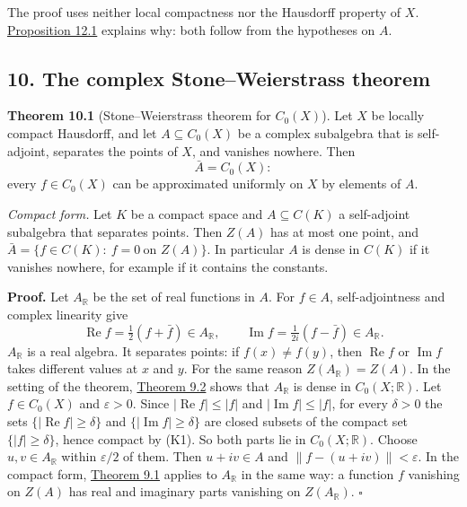 \documentclass[
  english,
  11pt,
  a4paper,
]{article}
\begin{document}
The proof uses neither local compactness nor the Hausdorff property of
\(X\).
\hyperlink{the-stone-weierstrass-theorem-for-functions-vanishing-at-infinity--oa-fnd-sw-10}{Proposition
12.1} explains why: both follow from the hypotheses on \(A\).

\subsection[10. The complex Stone--Weierstrass
theorem]{\texorpdfstring{\protect\hypertarget{the-stone-weierstrass-theorem-for-functions-vanishing-at-infinity--oa-fnd-sw-09}{}{}10.
The complex Stone--Weierstrass
theorem}{10. The complex Stone--Weierstrass theorem}}\label{the-stone-weierstrass-theorem-for-functions-vanishing-at-infinity--OA-FND-SW-09}

\textbf{Theorem 10.1} (Stone--Weierstrass theorem for \(C_0(X)\)). Let
\(X\) be locally compact Hausdorff, and let \(A\subseteq C_0(X)\) be a
complex subalgebra that is self-adjoint, separates the points of \(X\),
and vanishes nowhere. Then \[\bar A=C_0(X):
\tag{10.1}\] every \(f\in C_0(X)\) can be approximated uniformly on
\(X\) by elements of \(A\).

\emph{Compact form.} Let \(K\) be a compact space and
\(A\subseteq C(K)\) a self-adjoint subalgebra that separates points.
Then \(Z(A)\) has at most one point, and
\(\bar A=\{f\in C(K):\ f=0\ \text{on }Z(A)\}\). In particular \(A\) is
dense in \(C(K)\) if it vanishes nowhere, for example if it contains the
constants.

\textbf{Proof.} Let \(A_{\mathbb R}\) be the set of real functions in
\(A\). For \(f\in A\), self-adjointness and complex linearity give
\[\operatorname{Re}f=\tfrac12(f+\bar f)\in A_{\mathbb R},\qquad\operatorname{Im}f=\tfrac1{2i}(f-\bar f)\in A_{\mathbb R}.\]
\(A_{\mathbb R}\) is a real algebra. It separates points: if
\(f(x)\neq f(y)\), then \(\operatorname{Re}f\) or \(\operatorname{Im}f\)
takes different values at \(x\) and \(y\). For the same reason
\(Z(A_{\mathbb R})=Z(A)\). In the setting of the theorem,
\hyperlink{the-stone-weierstrass-theorem-for-functions-vanishing-at-infinity--oa-fnd-sw-08}{Theorem
9.2} shows that \(A_{\mathbb R}\) is dense in \(C_0(X;\mathbb R)\). Let
\(f\in C_0(X)\) and \(\varepsilon>0\). Since
\(|\operatorname{Re}f|\leq|f|\) and \(|\operatorname{Im}f|\leq|f|\), for
every \(\delta>0\) the sets \(\{|\operatorname{Re}f|\geq\delta\}\) and
\(\{|\operatorname{Im}f|\geq\delta\}\) are closed subsets of the compact
set \(\{|f|\geq\delta\}\), hence compact by (K1). So both parts lie in
\(C_0(X;\mathbb R)\). Choose \(u,v\in A_{\mathbb R}\) within
\(\varepsilon/2\) of them. Then \(u+iv\in A\) and
\(\|f-(u+iv)\|<\varepsilon\). In the compact form,
\hyperlink{the-stone-weierstrass-theorem-for-functions-vanishing-at-infinity--oa-fnd-sw-07}{Theorem
9.1} applies to \(A_{\mathbb R}\) in the same way: a function \(f\)
vanishing on \(Z(A)\) has real and imaginary parts vanishing on
\(Z(A_{\mathbb R})\). \(\square\)
\end{document}
